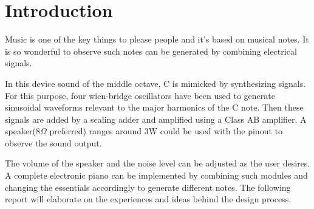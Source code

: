 \section{Introduction}
Music is one of the key things to please people and it’s based on musical notes. It is so wonderful to observe such notes can be generated by combining electrical signals.
\par
In this device sound of the middle octave, C is mimicked by synthesizing signals. For this purpose, four wien-bridge oscillators have been used to generate sinusoidal waveforms relevant to the major harmonics of the C note. Then these signals are added by a scaling adder and amplified using a Class AB amplifier. A speaker(8$\Omega$ preferred) ranges around 3W could be used with the pinout to observe the sound output. 
\par
The volume of the speaker and the noise level can be adjusted as the user desires. A complete electronic piano can be implemented by combining such modules and changing the essentials accordingly to generate different notes. The following report will elaborate on the experiences and ideas behind the design process.